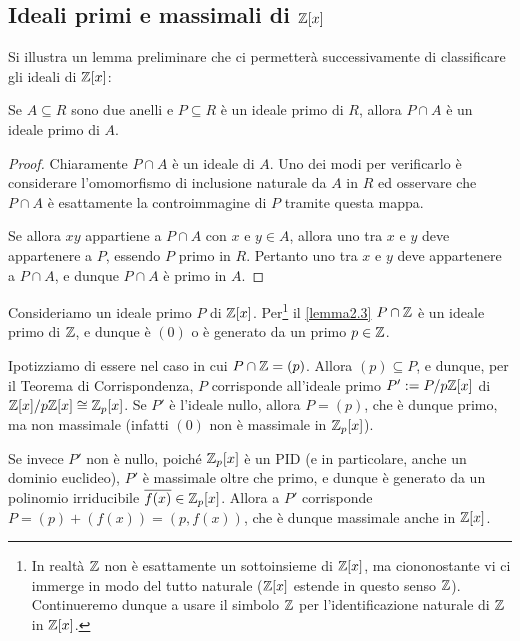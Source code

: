 \documentclass[11pt]{scrartcl}
\begin{document}
	\newpage
	
	\subsection{Ideali primi e massimali di {\texorpdfstring{$\mathbb Z[x]$}{ℤ[x]}}}
	
	Si illustra un lemma preliminare che ci permetterà successivamente
	di classificare gli ideali di $\mathbb Z[x]$:
	
	\begin{lemma}
		\label{lemma2.3}
		Se $A \subseteq R$ sono due anelli e $P \subseteq R$ è un ideale primo
		di $R$, allora $P\cap A$ è un ideale primo di $A$.
	\end{lemma}
	
	\begin{proof}
		Chiaramente $P \cap A$ è un ideale di $A$. Uno dei modi per verificarlo è
		considerare l'omomorfismo di inclusione naturale da $A$ in $R$ ed osservare
		che $P \cap A$ è esattamente la controimmagine di $P$ tramite questa
		mappa. \medskip
		

		Se allora $xy$ appartiene a $P \cap A$ con $x$ e $y \in A$, allora
		uno tra $x$ e $y$ deve appartenere a $P$, essendo $P$ primo in
		$R$. Pertanto uno tra $x$ e $y$ deve appartenere a $P \cap A$, e dunque
		$P \cap A$ è primo in $A$.
	\end{proof}
	
	
	Consideriamo un ideale primo $P$ di $\mathbb Z[x]$. Per\footnote{
		In realtà $\mathbb Z$ non è esattamente un sottoinsieme di $\mathbb Z[x]$,
		ma ciononostante vi ci immerge in modo del tutto naturale
		($\mathbb Z[x]$ estende in questo senso $\mathbb Z$). Continueremo dunque
		a usare il simbolo $\mathbb Z$ per l'identificazione naturale di $\mathbb Z$
		in $\mathbb Z[x]$.
	} il \autoref{lemma2.3}
	$P \cap \mathbb Z$ è un ideale primo di $\mathbb Z$, e dunque è $(0)$ o è generato
	da un primo $p \in \mathbb Z$. \medskip
	
	
	Ipotizziamo di essere nel caso in cui $P \cap \mathbb Z = (p)$. Allora $(p) \subseteq P$,
	e dunque, per il Teorema di Corrispondenza, $P$ corrisponde all'ideale primo $P' := P/p\mathbb Z[x]$
	di $\mathbb Z[x]/p\mathbb Z[x] \cong \mathbb Z_p[x]$. Se $P'$ è l'ideale nullo, allora $P = (p)$,
	che è dunque primo, ma non massimale (infatti $(0)$ non è massimale in $\mathbb Z_p[x]$). \medskip
	
	Se invece $P'$ non è nullo,
	poiché $\mathbb Z_p[x]$ è un PID (e in particolare,
	anche un dominio euclideo), $P'$ è massimale oltre che primo, e dunque è generato da un polinomio
	irriducibile $\overline{f(x)} \in \mathbb Z_p[x]$. Allora a $P'$ corrisponde
	$P = (p) + (f(x)) = (p, f(x))$, che è dunque massimale anche in $\mathbb Z[x]$. \medskip
	
\end{document}
